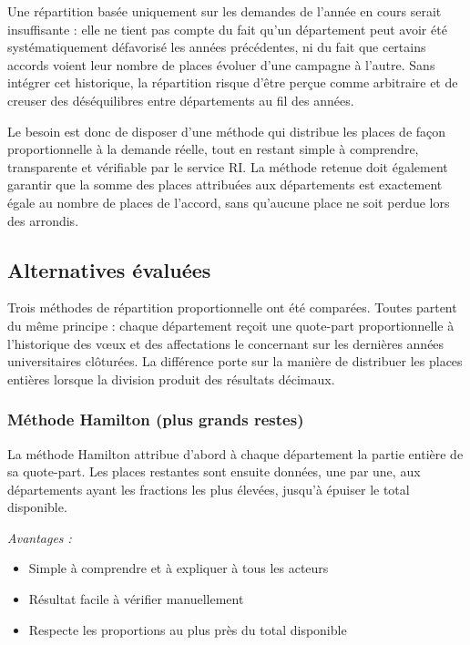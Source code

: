 Une répartition basée uniquement sur les demandes de l'année en cours serait
insuffisante : elle ne tient pas compte du fait qu'un département peut avoir été
systématiquement défavorisé les années précédentes, ni du fait que certains
accords voient leur nombre de places évoluer d'une campagne à l'autre. Sans
intégrer cet historique, la répartition risque d'être perçue comme arbitraire
et de creuser des déséquilibres entre départements au fil des années.

Le besoin est donc de disposer d'une méthode qui distribue les places de façon
proportionnelle à la demande réelle, tout en restant simple à comprendre,
transparente et vérifiable par le service RI. La méthode retenue doit également
garantir que la somme des places attribuées aux départements est exactement égale
au nombre de places de l'accord, sans qu'aucune place ne soit perdue lors des
arrondis.

\subsection{Alternatives évaluées}

Trois méthodes de répartition proportionnelle ont été comparées. Toutes
partent du même principe : chaque département reçoit une quote-part
proportionnelle à l'historique des vœux et des affectations le concernant
sur les dernières années universitaires clôturées. La différence porte sur la
manière de distribuer les places entières lorsque la division produit
des résultats décimaux.

\subsubsection{Méthode Hamilton (plus grands restes)}

La méthode Hamilton attribue d'abord à chaque département la partie entière
de sa quote-part. Les places restantes sont ensuite données, une par une,
aux départements ayant les fractions les plus élevées, jusqu'à épuiser le
total disponible.

\textit{Avantages :}
\begin{itemize}
  \item Simple à comprendre et à expliquer à tous les acteurs
  \item Résultat facile à vérifier manuellement
  \item Respecte les proportions au plus près du total disponible
\end{itemize}

